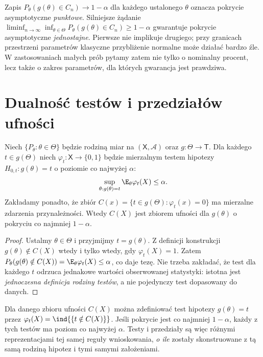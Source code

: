 \begin{uwaga}
Zapis $P_\theta(g(\theta)\in C_n)\to1-\alpha$ dla każdego
ustalonego $\theta$ oznacza pokrycie asymptotyczne \emph{punktowe}.
Silniejsze żądanie
$\liminf_{n\to\infty}\inf_{\theta\in\Theta}
P_\theta(g(\theta)\in C_n)\ge1-\alpha$
gwarantuje pokrycie asymptotyczne \emph{jednostajne}.
Pierwsze nie implikuje drugiego; przy granicach przestrzeni
parametrów klasyczne przybliżenie normalne może działać
bardzo źle. W zastosowaniach małych prób pytamy zatem nie tylko
o nominalny procent, lecz także o zakres parametrów, dla których
gwarancja jest prawdziwa.
\end{uwaga}

\section{Dualność testów i przedziałów ufności}
\begin{twierdzenie}\label{thm:test-inversion}
Niech $\{P_\theta:\theta\in\Theta\}$ będzie rodziną miar
na $(\mathsf X,\mathcal A)$ oraz $g:\Theta\to\mathsf T$.
Dla każdego $t\in g(\Theta)$ niech $\varphi_t:\mathsf X\to\{0,1\}$
będzie mierzalnym testem hipotezy
$H_{0,t}:g(\theta)=t$ o poziomie co najwyżej $\alpha$:
\[
 \sup_{\theta:g(\theta)=t}\E_\theta\varphi_t(X)\le\alpha.
\]
Zakładamy ponadto, że zbiór
$C(x)=\{t\in g(\Theta):\varphi_t(x)=0\}$ ma mierzalne
zdarzenia przynależności. Wtedy $C(X)$ jest zbiorem ufności
dla $g(\theta)$ o pokryciu co najmniej $1-\alpha$.
\end{twierdzenie}
\begin{proof}
Ustalmy $\theta\in\Theta$ i przyjmijmy $t=g(\theta)$.
Z definicji konstrukcji $g(\theta)\notin C(X)$ wtedy i tylko
wtedy, gdy $\varphi_t(X)=1$. Zatem
$P_\theta(g(\theta)\notin C(X))
=\E_\theta\varphi_t(X)\le\alpha$, co daje tezę.
Nie trzeba zakładać, że test dla każdego $t$ odrzuca
jednakowe wartości obserwowanej statystyki: istotna jest
\emph{jednoczesna definicja rodziny testów}, a nie pojedynczy
test dopasowany do danych.
\end{proof}

\begin{uwaga}
Dla danego zbioru ufności $C(X)$ można zdefiniować test
hipotezy $g(\theta)=t$ przez
$\varphi_t(X)=\ind{\{t\notin C(X)\}}$. Jeśli
pokrycie jest co najmniej $1-\alpha$, każdy z tych testów ma
poziom co najwyżej $\alpha$. Testy i przedziały są więc
różnymi reprezentacjami tej samej reguły wnioskowania,
\emph{o ile} zostały skonstruowane z tą samą rodziną hipotez
i tymi samymi założeniami.
\end{uwaga}

